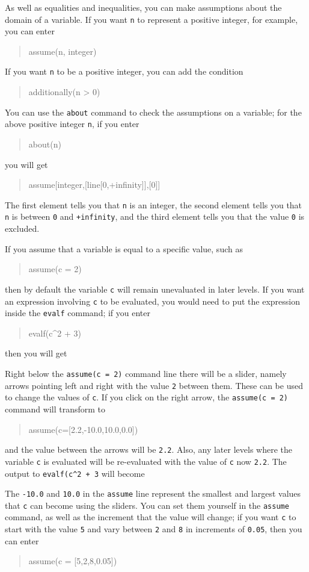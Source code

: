 \documentclass[a4paper,11pt]{book}
\newenvironment{giaccmd}
{\begin{quote}\ttfamily}
{\end{quote}}
\begin{document}
As well as equalities and inequalities, you can make assumptions about
the domain of a variable.  If you want \texttt{n} to represent a
positive integer, for example, you can enter
\begin{giaccmd}
  assume(n, integer)
\end{giaccmd}
If you want \texttt{n} to be a positive integer, you can add the
condition
\begin{giaccmd}
  additionally(n > 0)
\end{giaccmd}

You can use the \texttt{about} command to check the assumptions on a
variable; for the above positive integer \texttt{n}, if you enter
\begin{giaccmd}
  about(n)
\end{giaccmd}
you will get
\begin{giaccmd}
  assume[integer,[line[0,+infinity]],[0]]
\end{giaccmd}
The first element tells you that \texttt{n} is an integer, the second
element tells you that \texttt{n} is between \texttt{0} and
\texttt{+infinity}, and the third element tells you that the value
\texttt{0} is excluded.

If you assume that a variable is equal to a specific value, such as
\begin{giaccmd}
  assume(c = 2)
\end{giaccmd}
then by default the variable \texttt{c} will remain unevaluated in
later levels.  If you want an expression involving \texttt{c} to be
evaluated, you would need to put the expression inside the
\texttt{evalf} command; if you enter
\begin{giaccmd}
  evalf(c\^{}2 + 3)
\end{giaccmd}
then you will get 
\begin{giaccmd}
  7.0
\end{giaccmd}
Right below the \texttt{assume(c = 2)} command line
there will be a slider, namely arrows pointing left and right with the
value \texttt{2} between them.  These
can be used to change the values of \texttt{c}.  If you click on the
right arrow, the \texttt{assume(c = 2)} command will transform to
\begin{giaccmd}
  assume(c=[2.2,-10.0,10.0,0.0])
\end{giaccmd}
and the value between the arrows will be \texttt{2.2}.  Also, any
later levels where the variable \texttt{c} is evaluated will be
re-evaluated with the value of \texttt{c} now \texttt{2.2}.  The
output to \texttt{evalf(c\^{}2 + 3} will become
\begin{giaccmd}
  7.84
\end{giaccmd}
The \texttt{-10.0} and \texttt{10.0} in the \texttt{assume} line
represent the smallest and largest values that \texttt{c} can become
using the sliders.  You can set them yourself in the \texttt{assume}
command, as well as the increment that the value will change; if you
want \texttt{c} to start with the value \texttt{5} and vary between
\texttt{2} and \texttt{8} in increments of \texttt{0.05}, then you can
enter
\begin{giaccmd}
  assume(c = [5,2,8,0.05])
\end{giaccmd}
\end{document}
